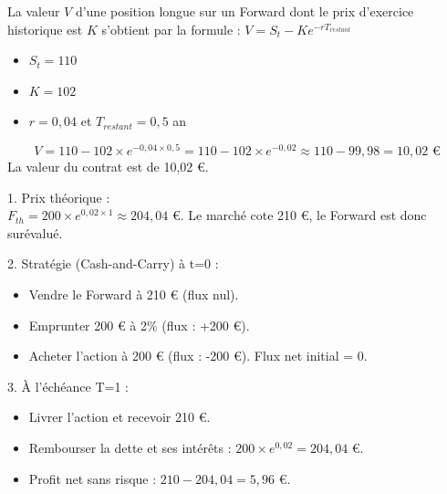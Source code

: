 \begin{correctionbox}
La valeur $V$ d'une position longue sur un Forward dont le prix d'exercice historique est $K$ s'obtient par la formule :
$V = S_t - K e^{-rT_{restant}}$
\begin{itemize}[label=$\cdot$]
    \item $S_t = 110$
    \item $K = 102$
    \item $r = 0,04$ et $T_{restant} = 0,5$ an
\end{itemize}
\begin{equation*}
    V = 110 - 102 \times e^{-0,04 \times 0,5} = 110 - 102 \times e^{-0,02} \approx 110 - 99,98 = 10,02 \text{ €}
\end{equation*}
La valeur du contrat est de 10,02 €.
\end{correctionbox}

\newpage

\begin{correctionbox}
1. Prix théorique :\\
$F_{th} = 200 \times e^{0,02 \times 1} \approx 204,04$ €. Le marché cote 210 €, le Forward est donc surévalué.

2. Stratégie (Cash-and-Carry) à t=0 :\\
\begin{itemize}[label=$\cdot$]
    \item Vendre le Forward à 210 € (flux nul).
    \item Emprunter 200 € à 2\% (flux : +200 €).
    \item Acheter l'action à 200 € (flux : -200 €). Flux net initial = 0.
\end{itemize}
3. À l'échéance T=1 :\\
\begin{itemize}[label=$\cdot$]
    \item Livrer l'action et recevoir 210 €.
    \item Rembourser la dette et ses intérêts : $200 \times e^{0,02} = 204,04$ €.
    \item Profit net sans risque : $210 - 204,04 = 5,96$ €.
\end{itemize}
\end{correctionbox}

